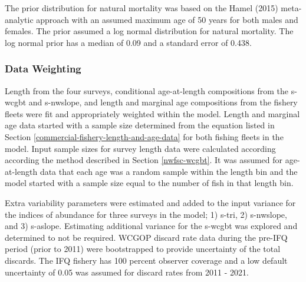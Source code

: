 \documentclass[11pt,
  english,
  a4paper,
]{article}
\begin{document}
\leavevmode\tagmcend\tagstructend\par


The prior distribution for natural mortality was based on the Hamel {(2015)\leavevmode\tagmcend\tagstructend} meta-analytic approach with an assumed maximum age of 50 years for both males and females. The prior assumed a log normal distribution for natural mortality. The log normal prior has a median of 0.09 and a standard error of 0.438.

\leavevmode\tagmcend\tagstructend\par


\hypertarget{data-weighting}{%
\subsubsection{Data Weighting}\label{data-weighting}}

\leavevmode\tagmcend\tagstructend


Length from the four surveys, conditional age-at-length compositions from the \gls{s-wcgbt} and \gls{s-nwslope}, and length and marginal age compositions from the fishery fleets were fit and appropriately weighted within the model. Length and marginal age data started with a sample size determined from the equation listed in Section \ref{commercial-fishery-length-and-age-data} for both fishing fleets in the model. Input sample sizes for survey length data were calculated according according the method described in Section \ref{nwfsc-wcgbt}. It was assumed for age-at-length data that each age was a random sample within the length bin and the model started with a sample size equal to the number of fish in that length bin.

\leavevmode\tagmcend\tagstructend\par


Extra variability parameters were estimated and added to the input variance for the indices of abundance for three surveys in the model; 1) \gls{s-tri}, 2) \gls{s-nwslope}, and 3) \gls{s-aslope}. Estimating additional variance for the \gls{s-wcgbt} was explored and determined to not be required. WCGOP discard rate data during the pre-IFQ period (prior to 2011) were bootstrapped to provide uncertainty of the total discards. The IFQ fishery has 100 percent observer coverage and a low default uncertainty of 0.05 was assumed for discard rates from 2011 - 2021.
\end{document}

